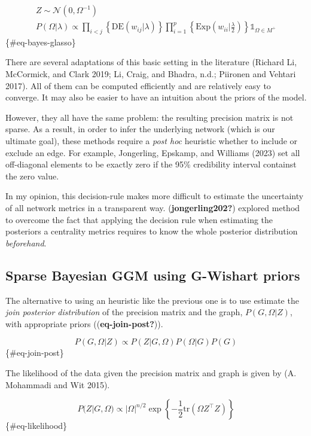 \documentclass[
]{article}
\begin{document}
\[
\begin{aligned}
Z \sim \mathcal N(0, \Omega^{-1})\\
P(\Omega | \lambda) \propto \prod_{i<j} \left \{ \text{DE}(w_{ij}|\lambda)\right \} \prod_{i=1}^p \left \{ \text{Exp}(w_{ii}|\frac \lambda 2)\right \} \mathbb 1 _{\Omega \in M^+}
\end{aligned}
\] \{\#eq-bayes-glasso\}

There are several adaptations of this basic setting in the literature
(Richard Li, McCormick, and Clark 2019; Li, Craig, and Bhadra, n.d.;
Piironen and Vehtari 2017). All of them can be computed efficiently and
are relatively easy to converge. It may also be easier to have an
intuition about the priors of the model.

However, they all have the same problem: the resulting precision matrix
is not sparse. As a result, in order to infer the underlying network
(which is our ultimate goal), these methods require a \emph{post hoc}
heuristic whether to include or exclude an edge. For example,
Jongerling, Epskamp, and Williams (2023) set all off-diagonal elements
to be exactly zero if the 95\% credibility interval containst the zero
value.

In my opinion, this decision-rule makes more difficult to estimate the
uncertainty of all network metrics in a transparent way.
(\textbf{jongerling202?}) explored method to overcome the fact that
applying the decision rule when estimating the posteriors a centrality
metrics requires to know the whole posterior distribution
\emph{beforehand}.

\hypertarget{sparse-bayesian-ggm-using-g-wishart-priors}{%
\subsection{Sparse Bayesian GGM using G-Wishart
priors}\label{sparse-bayesian-ggm-using-g-wishart-priors}}

The alternative to using an heuristic like the previous one is to use
estimate the \emph{join posterior distribution} of the precision matrix
and the graph, \(P(G, \Omega|Z)\), with appropriate priors
((\textbf{eq-join-post?})).

\[
P(G, \Omega|Z) \propto P(Z|G, \Omega) P(\Omega|G)P(G)
\] \{\#eq-join-post\}

The likelihood of the data given the precision matrix and graph is given
by (A. Mohammadi and Wit 2015).

\[
P(Z|G, \Omega) \propto |\Omega|^{n/2}\exp\left \{ -\frac 1 2 \text{tr}(\Omega Z^\top Z) \right\}
\] \{\#eq-likelihood\}
\end{document}
